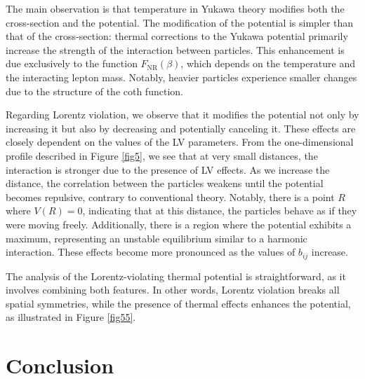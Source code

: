 \documentclass[11pt,showpacs,preprintnumbers,amsmath,amssymb,prd,nofootinbib,superscriptaddress]{revtex4-2}
\begin{document}
The main observation is that temperature in Yukawa theory modifies both the cross-section and the potential. The modification of the potential is simpler than that of the cross-section: thermal corrections to the Yukawa potential primarily increase the strength of the interaction between particles. This enhancement is due exclusively to the function $F_{\text{NR}}(\beta)$, which depends on the temperature and the interacting lepton mass. Notably, heavier particles experience smaller changes due to the structure of the coth function.

Regarding Lorentz violation, we observe that it modifies the potential not only by increasing it but also by decreasing and potentially canceling it. These effects are closely dependent on the values of the LV parameters. From the one-dimensional profile described in Figure \ref{fig5}, we see that at very small distances, the interaction is stronger due to the presence of LV effects. As we increase the distance, the correlation between the particles weakens until the potential becomes repulsive, contrary to conventional theory. Notably, there is a point $R$ where $V(R) = 0$, indicating that at this distance, the particles behave as if they were moving freely. Additionally, there is a region where the potential exhibits a maximum, representing an unstable equilibrium similar to a harmonic interaction. These effects become more pronounced as the values of $b_{ij}$ increase.

The analysis of the Lorentz-violating thermal potential is straightforward, as it involves combining both features. In other words, Lorentz violation breaks all spatial symmetries, while the presence of thermal effects enhances the potential, as illustrated in Figure \ref{fig55}.


\section{Conclusion}\label{secconclusions}
\end{document}
